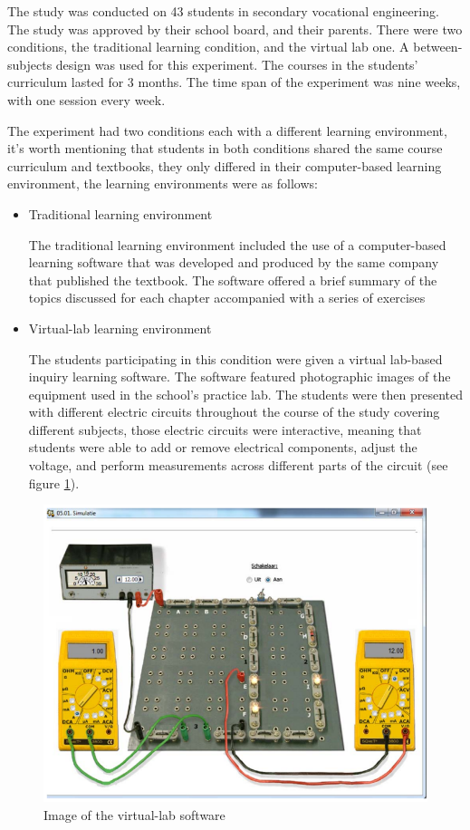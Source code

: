\documentclass[../main.tex]{subfiles}
\begin{document}
The study was conducted on 43 students in secondary vocational engineering. The study was approved by their school board, and their parents. There were two conditions, the traditional learning condition, and the virtual lab one. A between-subjects design was used for this experiment. The courses in the students’ curriculum lasted for 3 months. The time span of the experiment was nine weeks, with one session every week. 

The experiment had two conditions each with a different learning environment, it’s worth mentioning that students in both conditions shared the same course curriculum and textbooks, they only differed in their computer-based learning environment, the learning environments were as follows:
\begin{itemize}
    \item Traditional learning environment

    The traditional learning environment included the use of a computer-based learning software that was developed and produced by the same company that published the textbook. The software offered a brief summary of the topics discussed for each chapter accompanied with a series of exercises

    \item Virtual-lab learning environment

    The students participating in this condition were given a virtual lab-based inquiry learning software. The software featured photographic images of the equipment used in the school’s practice lab. The students were then presented with different electric circuits throughout the course of the study covering different subjects, those electric circuits were interactive, meaning that students were able to add or remove electrical components, adjust the voltage, and perform measurements across different parts of the circuit (see figure \ref{fig:image of the virtual-lab software}). 
\end{itemize}

\begin{figure}[!ht]
\centering
\includegraphics[scale=0.3]{images/chapter2/VirtualLab.png}
\caption{Image of the virtual-lab software}
\label{fig:image of the virtual-lab software}
\end{figure}
\end{document}
